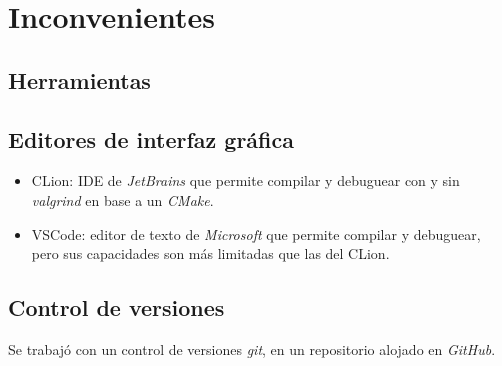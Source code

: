 \documentclass{article}
\begin{document}
\newpage

\section{Inconvenientes}
\label{sec:inconvenientes}	


\subsection{Herramientas}
%
\subsection{Editores de interfaz gráfica}

\begin{itemize}
	\item CLion: IDE de \textit{JetBrains} que permite compilar y debuguear con y sin \textit{valgrind} en base a un \textit{CMake}.
	\item VSCode: editor de texto de \textit{Microsoft} que permite compilar y debuguear, pero sus capacidades son más limitadas que las del CLion.
\end{itemize}

\subsection{Control de versiones}

Se trabajó con un control de versiones \textit{git}, en un repositorio alojado en \textit{GitHub}.

%
%
%
\end{document}
